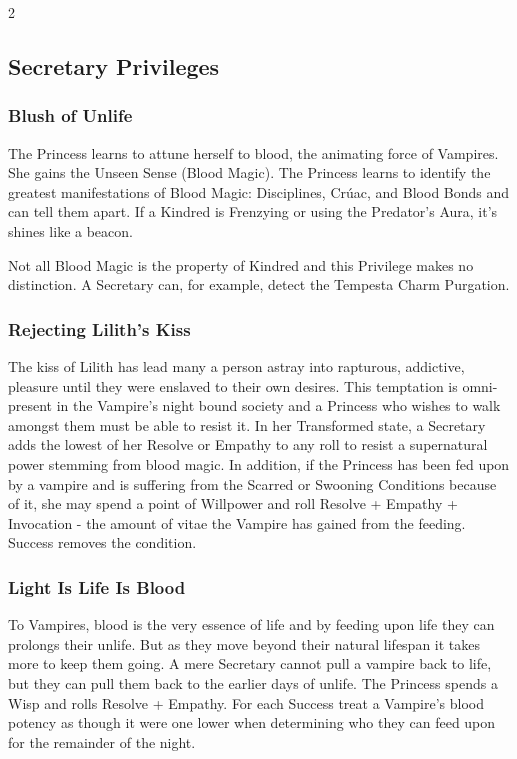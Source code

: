 \begin{multicols}{2}
\subsection*{Secretary Privileges}
\subsubsection*{Blush of Unlife}
The Princess learns to attune herself to blood, the animating force of Vampires. She gains the Unseen Sense (Blood Magic). The Princess learns to identify the greatest manifestations of Blood Magic: Disciplines, Cr\'{u}ac, and Blood Bonds and can tell them apart. If a Kindred is Frenzying or using the Predator’s Aura, it’s shines like a beacon. 

Not all Blood Magic is the property of Kindred and this Privilege makes no distinction. A Secretary can, for example, detect the Tempesta Charm Purgation. 


\subsubsection*{Rejecting Lilith’s Kiss} 
The kiss of Lilith has lead many a person astray into rapturous, addictive, pleasure until they were enslaved to their own desires. This temptation is omni-present in the Vampire's night bound society and a Princess who wishes to walk amongst them must be able to resist it. In her Transformed state, a Secretary adds the lowest of her Resolve or Empathy to any roll to resist a supernatural power stemming from blood magic. In addition, if the Princess has been fed upon by a vampire and is suffering from the Scarred or Swooning Conditions because of it, she may spend a point of Willpower and roll Resolve + Empathy + Invocation - the amount of vitae the Vampire has gained from the feeding. Success removes the condition. 


\subsubsection*{Light Is Life Is Blood} To Vampires, blood is the very essence of life and by feeding upon life they can prolongs their unlife. But as they move beyond their natural lifespan it takes more to keep them going. A mere Secretary cannot pull a vampire back to life, but they can pull them back to the earlier days of unlife. The Princess spends a Wisp and rolls Resolve + Empathy. For each Success treat a Vampire's blood potency as though it were one lower when determining who they can feed upon for the remainder of the night.



\end{multicols}

